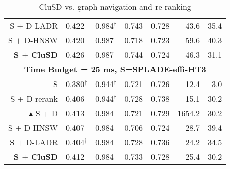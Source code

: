 \begin{table}[htbp]
{\begin{tabular}{r |llll|rr}
            S $+$ D-LADR & 0.422 & 0.984$^\dag$& 0.743&0.728& 43.6& 35.4\\
           S $+$ D-HNSW & 0.420 & 0.987 & 0.718 & 0.723 & 59.6 & 40.3 \\
            \bf S $+$ CluSD & 0.426 & 0.987 & 0.744 & 0.724 &46.3& 31.1\\
       \hline       
            \multicolumn{7}{c}{\bf{Time Budget = 25 ms, S=SPLADE-effi-HT3}}\\
            \hline
            S& 0.380$^\dag$& 0.944$^\dag$& 0.721 &  0.726 & 12.4 & 3.0 \\
             S + D-rerank & 0.406 & 0.944$^\dag$& 0.728 & 0.738 & 15.1 & 30.2 \\
            $\blacktriangle$  S + D & 0.413 & 0.984 & 0.721 &0.729 & 1654.2& 30.2  \\
            \hline
             S $+$ D-HNSW & 0.407 & 0.984 & 0.706 & 0.724 & 28.7 & 39.4\\
            S $+$ D-LADR & 0.404$^\dag$& 0.984 & 0.728 &  0.736 & 24.2 & 34.5\\
            \bf S $+$ CluSD & 0.412 & 0.984 & 0.733 & 0.728 & 25.4 & 30.2\\
			\hline\hline
		\end{tabular}  }
	\caption{CluSD vs. graph navigation and re-ranking 
}
	\label{tab:maintime}
\end{table}




